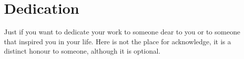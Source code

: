 \chapter*{Dedication}

Just if you want to dedicate your work to someone dear to you or to someone that inspired
you in your life. Here is not the place for acknowledge, it is a distinct honour to someone,
although it is optional.